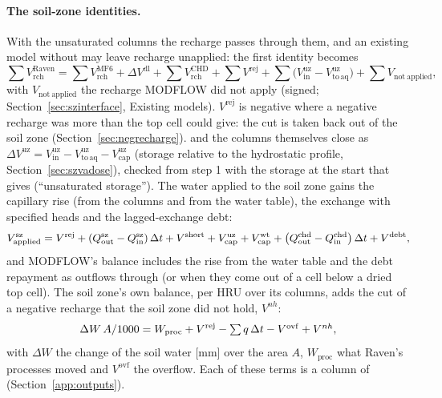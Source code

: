 \paragraph{The soil-zone identities.}\label{sec:accsz} With the unsaturated columns the recharge passes through them, and
an existing model without  may leave recharge unapplied: the first identity becomes
\begin{equation}
\sum V^{\mathrm{Raven}}_{\mathrm{rch}}=\sum V^{\mathrm{MF6}}_{\mathrm{rch}}+\Delta V^{\mathrm{dl}}+\sum V^{\mathrm{CHD}}_{\mathrm{rch}}+\sum V^{\mathrm{rej}}
+\sum\big(V^{\mathrm{uz}}_{\mathrm{in}}-V^{\mathrm{uz}}_{\mathrm{to\,aq}}\big)+\sum V_{\mathrm{not\ applied}},
\end{equation}
with $V_{\mathrm{not\ applied}}$ the recharge MODFLOW did not apply (signed; Section~\ref{sec:szinterface}, Existing
models). $V^{\mathrm{rej}}$ is negative where a negative recharge was more than the top cell could give: the cut is taken back
out of the soil zone (Section~\ref{sec:negrecharge}).
and the columns themselves close as
$\Delta V^{\mathrm{uz}}=V^{\mathrm{uz}}_{\mathrm{in}}-V^{\mathrm{uz}}_{\mathrm{to\,aq}}-V^{\mathrm{uz}}_{\mathrm{cap}}$ (storage relative to the
hydrostatic profile, Section~\ref{sec:szvadose}), checked from step 1 with the storage at the start that
 gives (``unsaturated storage''). The water applied to the soil zone gains the capillary rise (from the columns
and from the water table), the exchange with specified heads and the lagged-exchange debt:
\begin{equation}
V^{\mathrm{sz}}_{\mathrm{applied}}=V^{\mathrm{rej}}+\left(Q^{\mathrm{sz}}_{\mathrm{out}}-Q^{\mathrm{sz}}_{\mathrm{in}}\right)\Delta t+V^{\mathrm{short}}
+V^{\mathrm{uz}}_{\mathrm{cap}}+V^{\mathrm{wt}}_{\mathrm{cap}}+\left(Q^{\mathrm{chd}}_{\mathrm{out}}-Q^{\mathrm{chd}}_{\mathrm{in}}\right)\Delta t+V^{\mathrm{debt}},
\end{equation}
and MODFLOW's balance includes the rise from the water table and the debt repayment as outflows through
 (or  when they come out of a cell below a dried top cell). The soil zone's own balance,
per HRU over its columns, adds the cut of a negative recharge that the soil zone did not hold, $V^{nh}$:
\begin{equation}
\Delta W\,A/1000=W_{\mathrm{proc}}+V^{\mathrm{rej}}-\textstyle\sum q\,\Delta t-V^{\mathrm{ovf}}+V^{nh},
\end{equation}
with $\Delta W$ the change of the soil water [mm] over the area $A$, $W_{\mathrm{proc}}$ what Raven's processes moved and
$V^{\mathrm{ovf}}$ the overflow. Each of these terms is a column of  (Section~\ref{app:outputs}).


